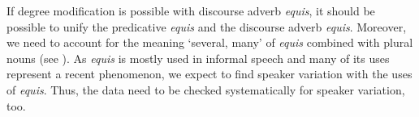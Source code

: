 \documentclass[output=paper
,modfonts
,nonflat]{langsci/langscibook}
\begin{document}
If degree modification is possible with discourse adverb \textit{equis}, it should be possible to unify the predicative \textit{equis} and the discourse adverb \textit{equis}. Moreover, we need to account for the meaning ‘several, many’ of \textit{equis} combined with plural nouns (see ).
As \textit{equis} is mostly used in informal speech and many of its uses represent a recent phenomenon, we expect to find speaker variation with the uses of \textit{equis}. Thus, the data need to be checked systematically for speaker variation, too.


{\sloppy\printbibliography[heading=subbibliography,notkeyword=this]}
\end{document}

